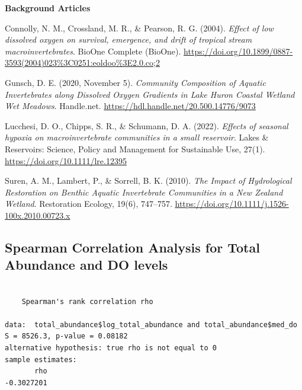 \documentclass[
  letterpaper,
  DIV=11,
  numbers=noendperiod]{scrartcl}
\newenvironment{Shaded}{\begin{snugshade}}{\end{snugshade}}
\newcommand{\AttributeTok}[1]{\textcolor[rgb]{0.40,0.45,0.13}{#1}}
\newcommand{\CommentTok}[1]{\textcolor[rgb]{0.37,0.37,0.37}{#1}}
\newcommand{\ConstantTok}[1]{\textcolor[rgb]{0.56,0.35,0.01}{#1}}
\newcommand{\FunctionTok}[1]{\textcolor[rgb]{0.28,0.35,0.67}{#1}}
\newcommand{\NormalTok}[1]{\textcolor[rgb]{0.00,0.23,0.31}{#1}}
\newcommand{\SpecialCharTok}[1]{\textcolor[rgb]{0.37,0.37,0.37}{#1}}
\newcommand{\StringTok}[1]{\textcolor[rgb]{0.13,0.47,0.30}{#1}}
\begin{document}
\textbf{Background Articles}

Connolly, N. M., Crossland, M. R., \& Pearson, R. G. (2004).
\emph{Effect of low dissolved oxygen on survival, emergence, and drift
of tropical stream macroinvertebrates}. BioOne Complete (BioOne).
\url{https://doi.org/10.1899/0887-3593(2004)023\%3C0251:eoldoo\%3E2.0.co;2}

Gunsch, D. E. (2020, November 5). \emph{Community Composition of Aquatic
Invertebrates along Dissolved Oxygen Gradients in Lake Huron Coastal
Wetland Wet Meadows}. Handle.net.
\url{https://hdl.handle.net/20.500.14776/9073}

Lucchesi, D. O., Chipps, S. R., \& Schumann, D. A. (2022). \emph{Effects
of seasonal hypoxia on macroinvertebrate communities in a small
reservoir}. Lakes \& Reservoirs: Science, Policy and Management for
Sustainable Use, 27(1). \url{https://doi.org/10.1111/lre.12395}

Suren, A. M., Lambert, P., \& Sorrell, B. K. (2010). \emph{The Impact of
Hydrological Restoration on Benthic Aquatic Invertebrate Communities in
a New Zealand Wetland}. Restoration Ecology, 19(6), 747--757.
\url{https://doi.org/10.1111/j.1526-100x.2010.00723.x}

\subsection{Spearman Correlation Analysis for Total Abundance and DO
levels}\label{spearman-correlation-analysis-for-total-abundance-and-do-levels}

\begin{Shaded}
\end{Shaded}

\begin{verbatim}

    Spearman's rank correlation rho

data:  total_abundance$log_total_abundance and total_abundance$med_do
S = 8526.3, p-value = 0.08182
alternative hypothesis: true rho is not equal to 0
sample estimates:
       rho 
-0.3027201 
\end{verbatim}
\end{document}
